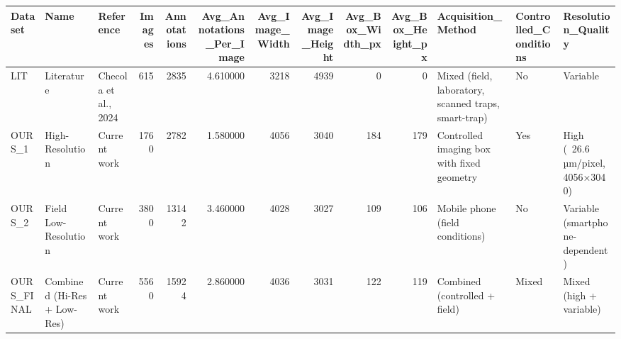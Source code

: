 \begin{tabular}{lllrrrrrrrlll}
\toprule
Dataset & Name & Reference & Images & Annotations & Avg_Annotations_Per_Image & Avg_Image_Width & Avg_Image_Height & Avg_Box_Width_px & Avg_Box_Height_px & Acquisition_Method & Controlled_Conditions & Resolution_Quality \\
\midrule
LIT & Literature & Checola et al., 2024 & 615 & 2835 & 4.610000 & 3218 & 4939 & 0 & 0 & Mixed (field, laboratory, scanned traps, smart-trap) & No & Variable \\
OURS_1 & High-Resolution & Current work & 1760 & 2782 & 1.580000 & 4056 & 3040 & 184 & 179 & Controlled imaging box with fixed geometry & Yes & High (~26.6 µm/pixel, 4056×3040) \\
OURS_2 & Field Low-Resolution & Current work & 3800 & 13142 & 3.460000 & 4028 & 3027 & 109 & 106 & Mobile phone (field conditions) & No & Variable (smartphone-dependent) \\
OURS_FINAL & Combined (Hi-Res + Low-Res) & Current work & 5560 & 15924 & 2.860000 & 4036 & 3031 & 122 & 119 & Combined (controlled + field) & Mixed & Mixed (high + variable) \\
\bottomrule
\end{tabular}
